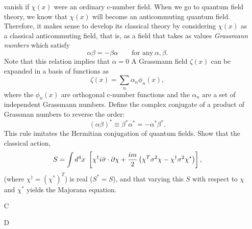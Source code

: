 \documentclass[10pt,letterpaper]{article}
\begin{document}
	vanish if $\chi(x)$ were an ordinary c-number field. When we go to quantum field theory, we know that 
	$\chi(x)$ will become an anticommuting quantum field. Therefore, it makes sense to develop its
	classical theory by considering $\chi(x)$ as a classical anticommuting field, that is, as a field that takes as
	values \emph{Grassmann numbers} which satisfy
	\[
		\alpha\beta = -\beta\alpha\qquad\text{for any}\ \alpha,\beta.
	\]
	Note that this relation implies that $\alpha = 0$ A Grassmann field $\zeta(x)$ can be expanded in a basis of functions
	as 
	\[
		\zeta(x) = \sum_n \alpha_n\phi_n(x),
	\]
	where the $\phi_n(x)$ are orthogonal c-number functions and the $\alpha_n$ are a set of independent Grassmann
	numbers. Define the complex conjugate of a product of Grassman numbers to reverse the order:
	\[
		(\alpha\beta)^* \equiv \beta^*\alpha^* = -\alpha^*\beta^*.
	\]
	This rule imitates the Hermitian conjugation of quantum fields. Show that the classical action,
	\[
		S = \int d^4x\ \blr{\chi^\dag i\bar\sigma\cdot\pd\chi +\frac{im}{2}\plr{ \chi^T\sigma^2\chi
		-\chi^\dag\sigma^2\chi^*}},
	\]
	(where $\chi^\dag = (\chi^*)^T$) is real ($S^*= S$), and that varying this $S$ with respect to $\chi$ 
	and $\chi^*$ yields the Majorana equation.
	\item
	C
	\item
	D	
	\eenum
	\eenum
\end{document}
